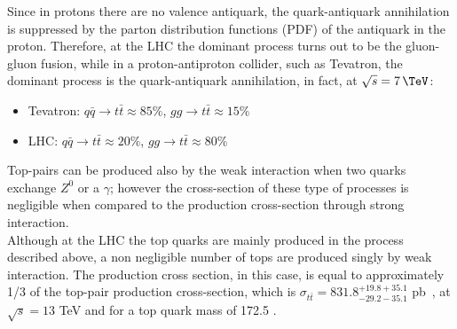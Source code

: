 \newline Since in protons there are no valence antiquark, the quark-antiquark annihilation is suppressed by 
the parton distribution functions (PDF) of the antiquark in the proton. Therefore, at the LHC the dominant process turns out to be the
gluon-gluon fusion, while in a proton-antiproton collider, such as Tevatron,
the dominant process is the quark-antiquark annihilation, in fact, at $\sqrt{s}= 7\,\TeV$:
\begin{itemize}
	\item Tevatron: $q\bar{q}\rightarrow t\bar{t} \approx 85\%$, $gg\rightarrow t\bar{t} \approx 15\%$
	\item LHC: $q\bar{q}\rightarrow t\bar{t} \approx 20\%$, $gg\rightarrow t\bar{t} \approx 80\%$
\end{itemize}
Top-pairs can be produced also by the weak interaction when two quarks exchange $Z^0$ or a $\gamma$; however the cross-section of these
type of processes is negligible when compared to the production cross-section through strong interaction.\\
Although at the LHC the top quarks are mainly produced in the process described above, a non negligible number of tops 
are produced singly by weak interaction. The production cross section, in this case, is equal to approximately 1/3 of the top-pair production
cross-section, which is $\sigma_{t\bar{t}} = 831.8^{+19.8+35.1}_{-29.2-35.1}$ pb~\cite{pdg}, at $\sqrt{s}=13$ TeV and for a top quark mass of 172.5 \GeV.

